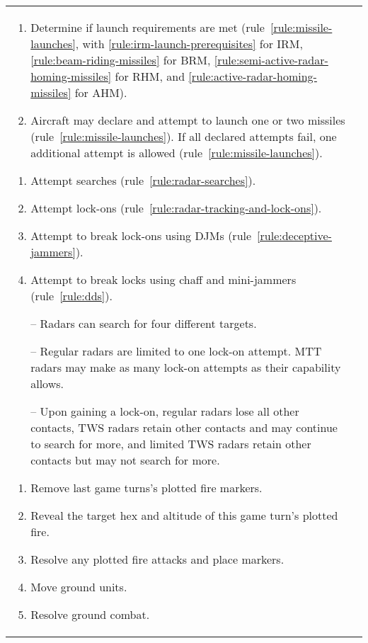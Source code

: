 \begin{twocolumntable}
\begin{tabularx}{1.0\linewidth}{L@{\hspace{\columnsep}}L}
{\begin{enumerate}[start=7]

\begin{enumerate}[nosep]
    \item Determine if launch requirements are met (rule~\ref{rule:missile-launches}, with \ref{rule:irm-launch-prerequisites} for IRM, \ref{rule:beam-riding-missiles} for BRM, \ref{rule:semi-active-radar-homing-missiles} for RHM, and \ref{rule:active-radar-homing-missiles} for AHM).
    \item Aircraft may declare and attempt to launch one or two missiles (rule~\ref{rule:missile-launches}). If all declared attempts fail, one additional attempt is allowed (rule~\ref{rule:missile-launches}).
\end{enumerate}


\begin{enumerate}[nosep]
    \item Attempt searches (rule~\ref{rule:radar-searches}).
    \item Attempt lock-ons (rule~\ref{rule:radar-tracking-and-lock-ons}).
    \item Attempt to break lock-ons using DJMs (rule~\ref{rule:deceptive-jammers}).
    \item Attempt to break locks using chaff and mini-jammers (rule~\ref{rule:dds}).
    \item[--] Radars can search for four different targets.
    \item[--] Regular radars are limited to one lock-on attempt. MTT radars may make as many lock-on attempts as their capability allows.
    \item[--] Upon gaining a lock-on, regular radars lose all other contacts, TWS radars retain other contacts and may continue to search for more, and limited TWS radars retain other contacts but may not search for more.    
\end{enumerate}


\begin{enumerate}[nosep]
    \item Remove last game turns's plotted fire markers.
    \item Reveal the target hex and altitude of this game turn's plotted fire.
    \item Resolve any plotted fire attacks and place markers.
    \item Move ground units.
    \item Resolve ground combat.
\end{enumerate}


\end{enumerate}}
\end{tabularx}
\end{twocolumntable}
